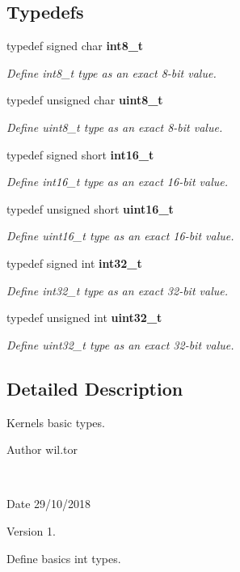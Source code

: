 \subsection*{Typedefs}
\begin{DoxyCompactItemize}
\item 
\mbox{\label{stdint_8h_aef44329758059c91c76d334e8fc09700}} 
typedef signed char \textbf{ int8\+\_\+t}
\begin{DoxyCompactList}\small\item\em Define int8\+\_\+t type as an exact 8-\/bit value. \end{DoxyCompactList}\item 
\mbox{\label{stdint_8h_aba7bc1797add20fe3efdf37ced1182c5}} 
typedef unsigned char \textbf{ uint8\+\_\+t}
\begin{DoxyCompactList}\small\item\em Define uint8\+\_\+t type as an exact 8-\/bit value. \end{DoxyCompactList}\item 
\mbox{\label{stdint_8h_a269259c924dce846340ddbb810db2e3c}} 
typedef signed short \textbf{ int16\+\_\+t}
\begin{DoxyCompactList}\small\item\em Define int16\+\_\+t type as an exact 16-\/bit value. \end{DoxyCompactList}\item 
\mbox{\label{stdint_8h_a273cf69d639a59973b6019625df33e30}} 
typedef unsigned short \textbf{ uint16\+\_\+t}
\begin{DoxyCompactList}\small\item\em Define uint16\+\_\+t type as an exact 16-\/bit value. \end{DoxyCompactList}\item 
\mbox{\label{stdint_8h_ab1967d8591af1a4e48c37fd2b0f184d0}} 
typedef signed int \textbf{ int32\+\_\+t}
\begin{DoxyCompactList}\small\item\em Define int32\+\_\+t type as an exact 32-\/bit value. \end{DoxyCompactList}\item 
\mbox{\label{stdint_8h_a435d1572bf3f880d55459d9805097f62}} 
typedef unsigned int \textbf{ uint32\+\_\+t}
\begin{DoxyCompactList}\small\item\em Define uint32\+\_\+t type as an exact 32-\/bit value. \end{DoxyCompactList}\end{DoxyCompactItemize}


\subsection{Detailed Description}
Kernel\textquotesingle{}s basic types. 

\begin{DoxyAuthor}{Author}
wil.\+tor
\end{DoxyAuthor}
 \begin{DoxyDate}{Date}
29/10/2018
\end{DoxyDate}
\begin{DoxyVersion}{Version}
1.
\end{DoxyVersion}
Define basics int types. 